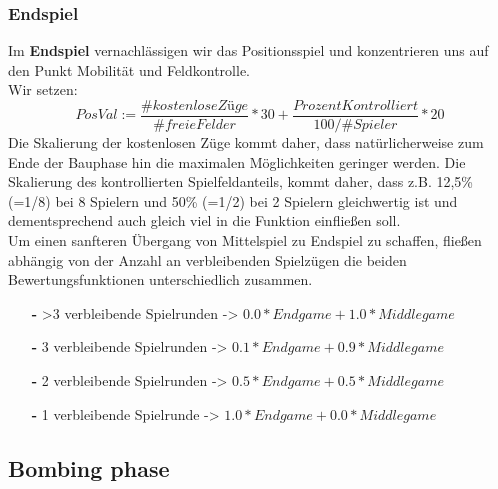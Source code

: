 \subsubsection{Endspiel}
Im \textbf{Endspiel} vernachlässigen wir das Positionsspiel und konzentrieren uns auf den Punkt Mobilität und Feldkontrolle.\\
Wir setzen:$$PosVal := \dfrac{\#kostenloseZüge}{\#freieFelder} * 30 + \dfrac{ProzentKontrolliert}{100/\#Spieler} * 20$$
Die Skalierung der kostenlosen Züge kommt daher, dass natürlicherweise zum Ende der Bauphase hin die maximalen Möglichkeiten geringer werden. Die Skalierung des kontrollierten Spielfeldanteils, kommt daher, dass z.B. 12,5\% (=1/8) bei 8 Spielern und 50\% (=1/2) bei 2 Spielern gleichwertig ist und dementsprechend auch gleich viel in die Funktion einfließen soll.\\
Um einen sanfteren Übergang von Mittelspiel zu Endspiel zu schaffen, fließen abhängig von der Anzahl an verbleibenden Spielzügen die beiden Bewertungsfunktionen unterschiedlich zusammen.
\begin{enumerate}
\item[\textbf{-}] >3 verbleibende Spielrunden -> $0.0*Endgame + 1.0*Middlegame$
\item[\textbf{-}] 3 verbleibende Spielrunden -> $0.1*Endgame + 0.9*Middlegame$
\item[\textbf{-}] 2 verbleibende Spielrunden -> $0.5*Endgame + 0.5*Middlegame$
\item[\textbf{-}] 1 verbleibende Spielrunde -> $1.0*Endgame + 0.0*Middlegame$
\end{enumerate}

\subsection{Bombing phase}